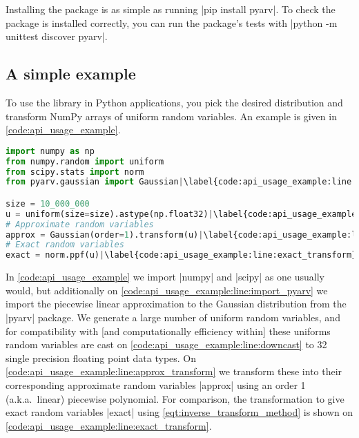 Installing the package is as simple as running \inlineplain|pip install pyarv|. To check the package is installed correctly, you can run the package's tests with \inlineplain|python -m unittest discover pyarv|. 

\subsection{A simple example}

To use the \pyarv library in Python applications, you pick the desired distribution and transform NumPy arrays of uniform random variables. An example is given in \cref{code:api_usage_example}. 

\begin{lstfloat}[htb]
\begin{lstlisting}[language={python}, caption={Example usage of the \pyarv API.}, label={code:api_usage_example}, escapechar=|]
import numpy as np 
from numpy.random import uniform 
from scipy.stats import norm
from pyarv.gaussian import Gaussian|\label{code:api_usage_example:line:import_pyarv}|

size = 10_000_000  
u = uniform(size=size).astype(np.float32)|\label{code:api_usage_example:line:downcast}|
# Approximate random variables
approx = Gaussian(order=1).transform(u)|\label{code:api_usage_example:line:approx_transform}|
# Exact random variables
exact = norm.ppf(u)|\label{code:api_usage_example:line:exact_transform}|
\end{lstlisting}
\end{lstfloat}

In \cref{code:api_usage_example} we import \inlineplain|numpy| and \inlineplain|scipy| as one usually would, but additionally on \cref{code:api_usage_example:line:import_pyarv} we import the piecewise linear approximation to the Gaussian distribution from the \inlineplain|pyarv| package. We generate a large number of uniform random variables, and for compatibility with [and computationally efficiency within] \pyarv these uniforms random variables are cast on \cref{code:api_usage_example:line:downcast} to \qty{32}{\bit} single precision floating point data types. On \cref{code:api_usage_example:line:approx_transform} we transform these into their corresponding approximate random variables \inlineplain|approx| using an order 1 (a.k.a.\ linear) piecewise polynomial. For comparison, the transformation to give exact random variables \inlineplain|exact| using \cref{eqt:inverse_transform_method} is shown on \cref{code:api_usage_example:line:exact_transform}.


